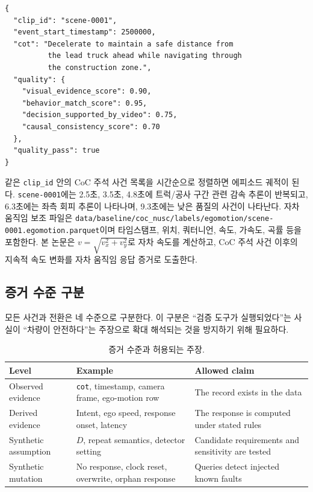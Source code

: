 \noindent\begin{minipage}{\columnwidth}
\begin{lstlisting}[caption={scene-0001의 CoC 사건 레코드 예시. 점수는 모델이 생성한 검증 신호이다.},label={lst:coc-record}]
{
  "clip_id": "scene-0001",
  "event_start_timestamp": 2500000,
  "cot": "Decelerate to maintain a safe distance from
          the lead truck ahead while navigating through
          the construction zone.",
  "quality": {
    "visual_evidence_score": 0.90,
    "behavior_match_score": 0.95,
    "decision_supported_by_video": 0.75,
    "causal_consistency_score": 0.70
  },
  "quality_pass": true
}
\end{lstlisting}
\end{minipage}

같은 \texttt{clip\_id} 안의 CoC 주석 사건 목록을 시간순으로 정렬하면 에피소드 궤적이 된다. \texttt{scene-0001}에는 2.5초, 3.5초, 4.8초에 트럭/공사 구간 관련 감속 추론이 반복되고, 6.3초에는 좌측 회피 추론이 나타나며, 9.3초에는 낮은 품질의 사건이 나타난다. 자차 움직임 보조 파일은 \texttt{data/baseline/coc\_nusc/labels/egomotion/scene-0001.egomotion.parquet}이며 타임스탬프, 위치, 쿼터니언, 속도, 가속도, 곡률 등을 포함한다. 본 논문은 $v=\sqrt{v_x^2+v_y^2}$로 자차 속도를 계산하고, CoC 주석 사건 이후의 지속적 속도 변화를 자차 움직임 응답 증거로 도출한다.

\subsection{증거 수준 구분}
모든 사건과 전환은 네 수준으로 구분한다. 이 구분은 ``검증 도구가 실행되었다''는 사실이 ``차량이 안전하다''는 주장으로 확대 해석되는 것을 방지하기 위해 필요하다.

\begin{table}[t]
\centering
\caption{증거 수준과 허용되는 주장.}
\label{tab:evidence-level}
\footnotesize
\begin{tabularx}{\columnwidth}{L{0.24\columnwidth}YY}
\toprule
Level & Example & Allowed claim \\
\midrule
Observed evidence & \texttt{cot}, timestamp, camera frame, ego-motion row & The record exists in the data \\
Derived evidence & Intent, ego speed, response onset, latency & The response is computed under stated rules \\
Synthetic assumption & $D$, repeat semantics, detector setting & Candidate requirements and sensitivity are tested \\
Synthetic mutation & No response, clock reset, overwrite, orphan response & Queries detect injected known faults \\
\bottomrule
\end{tabularx}
\end{table}


